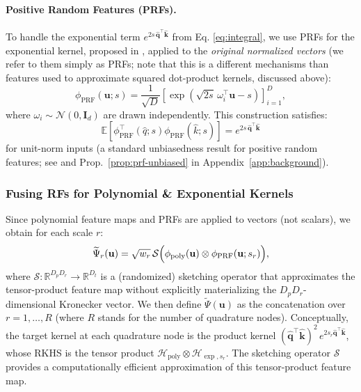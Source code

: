 \documentclass{article}
\newcommand{\R}{\mathbb{R}}
\begin{document}
\paragraph{Positive Random Features (PRFs).}
To handle the exponential term $e^{2s\,\widehat{\mathbf{q}}^\top \widehat{\mathbf{k}}}$ from Eq. \ref{eq:integral}, we use PRFs for the exponential kernel, proposed in \citep{performers}, applied to the \emph{original normalized vectors} (we refer to them simply as PRFs; note that this is a different mechanisms than features used to approximate squared dot-product kernels, discussed above):
\begin{equation}
\phi_{\text{PRF}}(\mathbf{u}; s)
=
\frac{1}{\sqrt{D}}
\left[
\exp\!\left(\sqrt{2s}\,\omega_i^\top \mathbf{u} - s\right)
\right]_{i=1}^D,
\end{equation}
where $\omega_i \sim \mathcal{N}(0, \mathbf{I}_d)$ are drawn independently.
This construction satisfies:
\[
\mathbb{E}\!\left[
\phi^{\top}_{\text{PRF}}(\hat q; s)
\phi_{\text{PRF}}(\hat k; s) 
\right]
=
e^{2s\,\widehat{\mathbf{q}}^\top \widehat{\mathbf{k}}}
\]
for unit-norm inputs (a standard unbiasedness result for positive random features; see \citep{performers} and Prop.~\ref{prop:prf-unbiased} in Appendix~\ref{app:background}).

\subsubsection{Fusing RFs for Polynomial \& Exponential Kernels}
Since polynomial feature maps and PRFs are applied to vectors (not scalars), we obtain for each scale $r$:
\begin{equation}
\widetilde{\Psi}_r(\mathbf{u})
=
\sqrt{w_r}\,\mathcal{S}\Bigl(\phi_{\text{poly}}(\mathbf{u})\otimes \phi_{\text{PRF}}(\mathbf{u}; s_r)\Bigr),
\end{equation}
where $\mathcal{S}:\R^{D_pD_r}\to\R^{D_t}$ is a (randomized) sketching operator that approximates the tensor-product feature map without explicitly materializing the $D_pD_r$-dimensional Kronecker vector.
We then define $\widetilde{\Psi}(\mathbf{u})$ as the concatenation over $r=1,\dots,R$ (where $R$ stands for the number of quadrature nodes). Conceptually, the target kernel at each quadrature node is the product kernel $(\widehat{\mathbf{q}}^\top \widehat{\mathbf{k}})^2\,e^{2s_r\widehat{\mathbf{q}}^\top \widehat{\mathbf{k}}}$, whose RKHS is the tensor product $\mathcal{H}_{\text{poly}}\otimes\mathcal{H}_{\exp,s_r}$. The sketching operator $\mathcal{S}$ provides a computationally efficient approximation of this tensor-product feature map.
\end{document}
